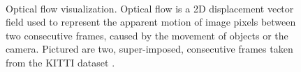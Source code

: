 \begin{figure}[t]
\begin{center}
	\\
	\caption[Optical flow visualization]{Optical flow visualization. Optical flow is a 2D displacement vector field used to represent the apparent motion of image pixels between two consecutive frames, caused by the movement of objects or the camera. Pictured are two, super-imposed, consecutive frames taken from the KITTI dataset \cite{geiger2013vision}.}
	\vspace{-0.65cm}
	\label{fig:optical_flow}
\end{center}
\end{figure}